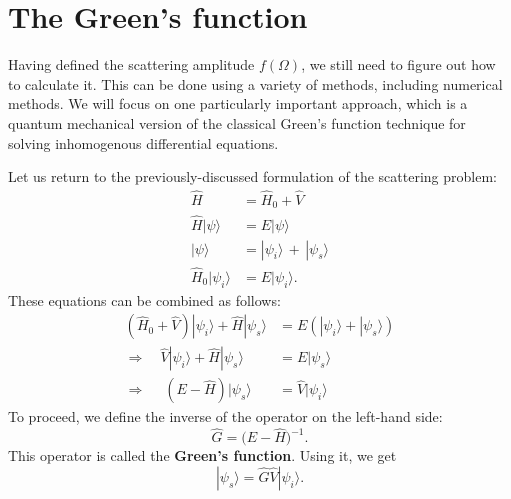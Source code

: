 \documentclass[pra,12pt]{revtex4}
\begin{document}
\section{The Green's function}
\label{sec:greensfun}

Having defined the scattering amplitude $f(\Omega)$, we still need to
figure out how to calculate it.  This can be done using a variety of
methods, including numerical methods.  We will focus on one
particularly important approach, which is a quantum mechanical version
of the classical Green's function technique for solving inhomogenous
differential equations.

Let us return to the previously-discussed formulation of the
scattering problem:
$$\begin{aligned} \hat{H} &= \hat{H}_0+\hat{V} \\ \hat{H} |\psi\rangle &= E |\psi\rangle \\ |\psi\rangle &= |\psi_i\rangle \,+\, |\psi_s\rangle \\ \hat{H}_0 |\psi_i\rangle &= E |\psi_i\rangle.\end{aligned}$$
These equations can be combined as follows:
$$\begin{aligned} \left(\hat{H}_0 + \hat{V}\right) |\psi_i\rangle + \hat{H} |\psi_s\rangle &= E \left( |\psi_i\rangle + |\psi_s\rangle \right) \\ \Rightarrow \quad \hat{V} |\psi_i\rangle + \hat{H} |\psi_s\rangle &= E |\psi_s\rangle  \\ \Rightarrow \quad\; \left(E - \hat{H}\right) |\psi_s\rangle & = \hat{V} |\psi_i\rangle
\end{aligned}$$
To proceed, we define the inverse of the operator on the left-hand
side:
$$\hat{G} = \big(E-\hat{H}\big)^{-1}.$$
This operator is called the \textbf{Green's function}.  Using it, we
get
$$|\psi_s\rangle = \hat{G} \hat{V} |\psi_i\rangle.$$
\end{document}
